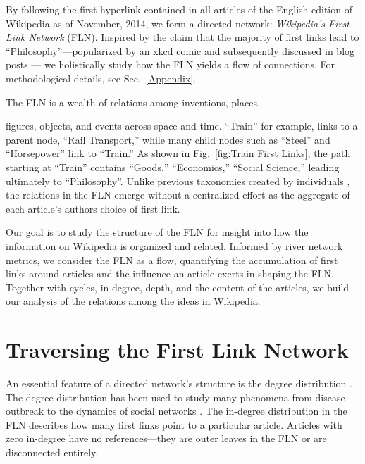 \documentclass[pre,twocolumn,twoside,superscriptaddress,floatfix]{revtex4-1}
\begin{document}
By following the first hyperlink contained in all articles of the English edition of
Wikipedia as of November, 2014, we form a directed network:
{\it Wikipedia's First Link Network} (FLN).
Inspired by the claim that the majority of first links lead to
``Philosophy''---popularized by an 
\href{https://xkcd.com/903/}{xkcd}
comic and subsequently
discussed in blog posts 
\cite{xkcd, mat_blog, Ilmari_first_links, 
bob_west}
---
we holistically study how the FLN  yields a flow of connections.
For methodological details, see Sec.~\ref{Appendix}. 

The FLN is a wealth of relations among inventions, places,
{figures, objects, and events across space and time.
``Train'' for example, links to a parent node, ``Rail Transport,''
while many child nodes such as ``Steel'' and ``Horsepower'' link to ``Train.''
As shown in Fig.~\ref{fig:Train First Links}, the path starting at ``Train'' 
contains ``Goods,'' ``Economics,'' ``Social Science,''
leading ultimately to ``Philosophy''.
Unlike previous taxonomies created by individuals
\cite{Bolton2007, descartes, aristotle, hist_thesaurus},
the relations in the FLN emerge without a centralized effort 
as the aggregate of each article's authors choice of first link.

Our goal is to study the structure of the FLN for insight into how the information on Wikipedia is organized and related.
Informed by river network metrics,
we consider the FLN as a flow, quantifying 
the accumulation of first links around articles 
and the influence an article exerts in shaping the FLN.
Together with cycles, in-degree, depth, and the content of the articles, 
we build our analysis of the relations among the ideas in Wikipedia.

\section{Traversing the First Link Network}
\label{Traversal Algorithm}

An essential feature of a directed network's structure is the degree distribution 
\cite{newman2003structure}. 
The degree distribution has been used to study many phenomena from disease outbreak 
\cite{eubank2004modelling} 
to the dynamics of social networks 
\cite{newman2002random}.
The in-degree distribution in the FLN describes how many first links point to a 
particular article. 
Articles with zero in-degree have no references---they are outer leaves in the FLN 
or are disconnected entirely. 

}
\end{document}
